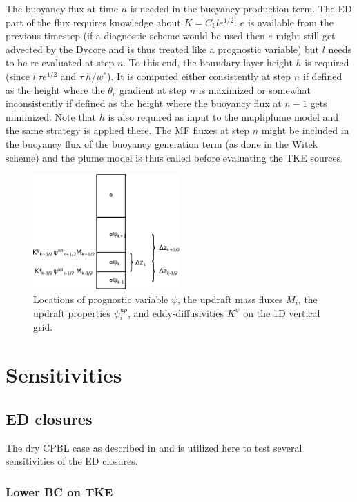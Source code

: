 \documentclass[dvipdfmx,a4paper,10pt]{article}
\begin{document}
The buoyancy flux at time $n$ is needed in the buoyancy production term. The ED part of the flux requires knowledge about $K=C_k l e^{1/2}$. $e$ is available from the previous timestep (if a diagnostic scheme would be used then $e$ might still get advected by the Dycore and is thus treated like a prognostic variable) but $l$ needs to be re-evaluated at step $n$. To this end, the boundary layer height $h$ is required (since $l~ \tau e^{1/2}$ and $\tau ~ h/w^*$). It is computed either consistently at step $n$ if defined as the height where the $\theta_v$ gradient at step $n$ is maximized or somewhat inconsistently if defined as the height where the buoyancy flux at $n-1$ gets minimized.  Note that $h$ is also required as input to the mupliplume model and the same strategy is applied there. The MF fluxes at step $n$ might be included in the buoyancy flux of the buoyancy generation term (as done in the Witek scheme) and the plume model is thus called before evaluating the TKE sources.


\begin{figure}[bthp]
\centering
 \includegraphics[width=0.5\textwidth]{staggering.eps}
\caption{Locations of prognostic variable $\psi$, the updraft mass fluxes $M_i$, the updraft properties $\psi^{up}_i$, and eddy-diffusivities $K^{\psi}$ on the 1D vertical grid. } \label{fig:staggering}
\end{figure}

\section{Sensitivities}
\subsection{ED closures}

The dry CPBL case as described in \cite{nieuwstadt93} and \cite{witek11} is utilized here to test several sensitivities of the ED closures. 

\subsubsection{Lower BC on TKE}
\end{document}

